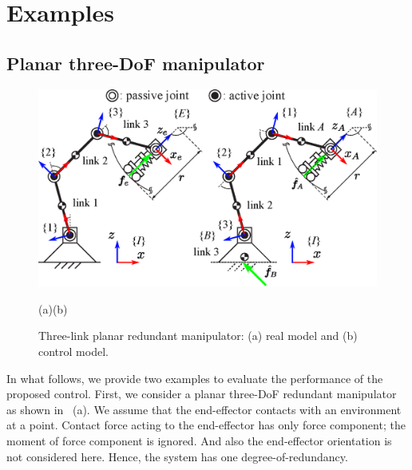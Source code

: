 \section{Examples}

\subsection{Planar three-DoF manipulator}
%
\begin{figure}[t]
  \centering
  \begin{minipage}{0.8\linewidth}
    \centering
    \includegraphics[width=1.0\linewidth]{fig/chapter6/3Rmani.eps}
    \footnotesize\par{\hspace{-20mm}(a)\hspace{70mm}(b)}
  \end{minipage}
  \caption{Three-link planar redundant manipulator: (a) real model and (b) control model.}
  \label{fig:3R_MANI}
\end{figure}
%
In what follows, we provide two examples to evaluate the performance of the proposed control.
First, we consider a planar three-DoF redundant manipulator as shown in ~(a).
We assume that the end-effector contacts with an environment at a point.
Contact force acting to the end-effector has only force component;
the moment of force component is ignored.
And also the end-effector orientation is not considered here.
Hence, the system has one degree-of-redundancy.

